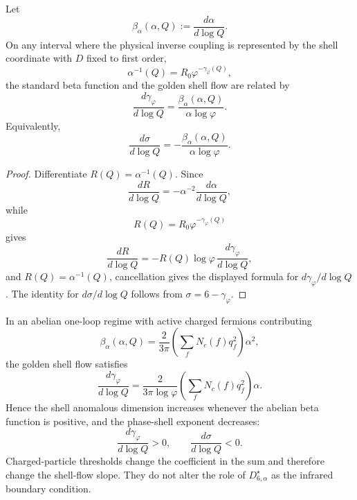 \begin{theorem}
\label{thm:zeckendorf-renormalization-dictionary-golden-shell-flow}
Let
$$
  \beta_\alpha(\alpha,Q)
  :=
  \frac{d\alpha}{d\log Q}.
$$
On any interval where the physical inverse coupling is represented by
the shell coordinate with $D$ fixed to first order,
$$
  \alpha^{-1}(Q)=R_0\varphi^{-\gamma_\varphi(Q)},
$$
the standard beta function and the golden shell flow are related by
$$
  \frac{d\gamma_\varphi}{d\log Q}
  =
  \frac{\beta_\alpha(\alpha,Q)}{\alpha\log\varphi}.
$$
Equivalently,
$$
  \frac{d\sigma}{d\log Q}
  =
  -
  \frac{\beta_\alpha(\alpha,Q)}{\alpha\log\varphi}.
$$
\end{theorem}
\begin{proof}
Differentiate $R(Q)=\alpha^{-1}(Q)$. Since
$$
  \frac{dR}{d\log Q}
  =
  -\alpha^{-2}
  \frac{d\alpha}{d\log Q},
$$
while
$$
  R(Q)=R_0\varphi^{-\gamma_\varphi(Q)}
$$
gives
$$
  \frac{dR}{d\log Q}
  =
  -R(Q)\log\varphi\,
  \frac{d\gamma_\varphi}{d\log Q},
$$
and $R(Q)=\alpha^{-1}(Q)$, cancellation gives the displayed formula for
$d\gamma_\varphi/d\log Q$. The identity for $d\sigma/d\log Q$ follows
from $\sigma=6-\gamma_\varphi$.
\end{proof}

\begin{corollary}
\label{cor:zeckendorf-abelian-one-loop-shell-flow}
In an abelian one-loop regime with active charged fermions contributing
$$
  \beta_\alpha(\alpha,Q)
  =
  \frac{2}{3\pi}
  \left(
    \sum_f N_c(f)q_f^2
  \right)
  \alpha^2,
$$
the golden shell flow satisfies
$$
  \frac{d\gamma_\varphi}{d\log Q}
  =
  \frac{2}{3\pi\log\varphi}
  \left(
    \sum_f N_c(f)q_f^2
  \right)
  \alpha.
$$
Hence the shell anomalous dimension increases whenever the abelian beta
function is positive, and the phase-shell exponent decreases:
$$
  \frac{d\gamma_\varphi}{d\log Q}>0,
  \qquad
  \frac{d\sigma}{d\log Q}<0.
$$
Charged-particle thresholds change the coefficient in the sum and
therefore change the shell-flow slope. They do not alter the role of
$D_{6,\alpha}^{\star}$ as the infrared boundary condition.
\end{corollary}
